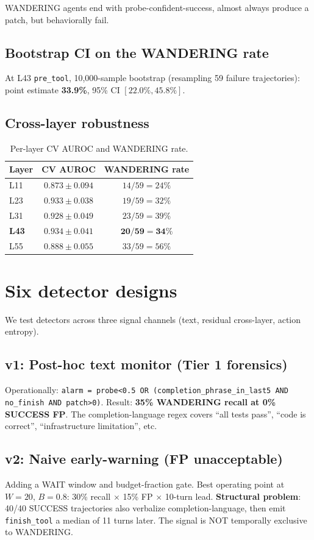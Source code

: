 \documentclass[11pt]{article}
\begin{document}
WANDERING agents end with probe-confident-success, almost always produce a patch, but behaviorally fail.

\subsection{Bootstrap CI on the WANDERING rate}
At L43 \texttt{pre\_tool}, 10,000-sample bootstrap (resampling 59 failure trajectories): point estimate \textbf{33.9\%}, 95\% CI $[22.0\%, 45.8\%]$.

\subsection{Cross-layer robustness}
\begin{table}[h]
\centering
\caption{Per-layer CV AUROC and WANDERING rate.}
\begin{tabular}{lcc}
\toprule
Layer & CV AUROC & WANDERING rate \\
\midrule
L11 & $0.873 \pm 0.094$ & $14/59 = 24\%$ \\
L23 & $0.933 \pm 0.038$ & $19/59 = 32\%$ \\
L31 & $0.928 \pm 0.049$ & $23/59 = 39\%$ \\
\textbf{L43} & $\mathbf{0.934 \pm 0.041}$ & $\mathbf{20/59 = 34\%}$ \\
L55 & $0.888 \pm 0.055$ & $33/59 = 56\%$ \\
\bottomrule
\end{tabular}
\end{table}

\section{Six detector designs}

We test detectors across three signal channels (text, residual cross-layer, action entropy).

\subsection{v1: Post-hoc text monitor (Tier 1 forensics)}
Operationally: \texttt{alarm = probe<0.5 OR (completion\_phrase\_in\_last5 AND no\_finish AND patch>0)}. Result: \textbf{35\% WANDERING recall at 0\% SUCCESS FP}. The completion-language regex covers ``all tests pass'', ``code is correct'', ``infrastructure limitation'', etc.

\subsection{v2: Naive early-warning (FP unacceptable)}
Adding a WAIT window and budget-fraction gate. Best operating point at $W=20$, $B=0.8$: 30\% recall $\times$ 15\% FP $\times$ 10-turn lead. \textbf{Structural problem}: 40/40 SUCCESS trajectories also verbalize completion-language, then emit \texttt{finish\_tool} a median of 11 turns later. The signal is NOT temporally exclusive to WANDERING.
\end{document}
